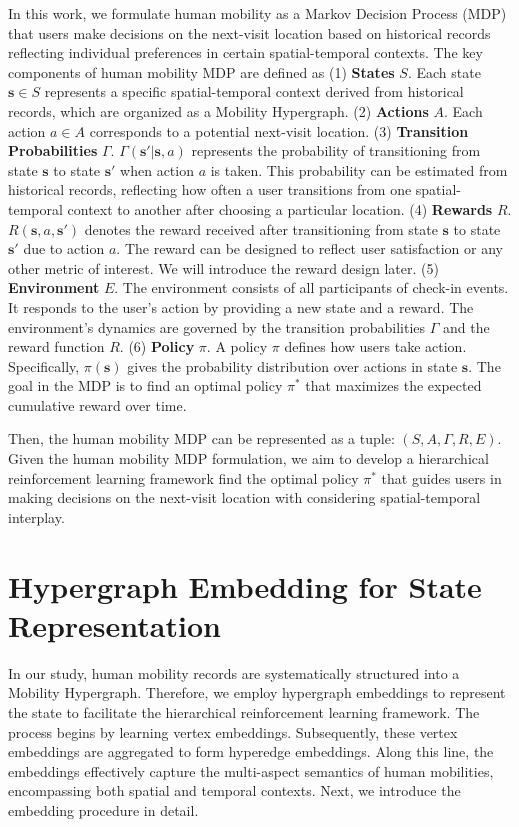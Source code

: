 \documentclass[letterpaper]{article} %
\begin{document}
In this work, we formulate human mobility as a Markov Decision Process (MDP) that users make decisions on the next-visit location based on historical records reflecting individual preferences in certain spatial-temporal contexts. The key components of human mobility MDP are defined as
(1) \textbf{States} $S$. Each state $\mathbf{s} \in S$ represents a specific spatial-temporal context derived from historical records, which are organized as a Mobility Hypergraph.
(2) \textbf{Actions} $A$. Each action $a \in A$ corresponds to a potential next-visit location.
(3) \textbf{Transition Probabilities} $\Gamma$. $\Gamma(\mathbf{s}'|\mathbf{s}, a)$ represents the probability of transitioning from state $\mathbf{s}$ to state $\mathbf{s}'$ when action $a$ is taken. This probability can be estimated from historical records, reflecting how often a user transitions from one spatial-temporal context to another after choosing a particular location.
(4) \textbf{Rewards} $R$. $R(\mathbf{s}, a, \mathbf{s}')$ denotes the reward received after transitioning from state $\mathbf{s}$ to state $\mathbf{s}'$ due to action $a$. The reward can be designed to reflect user satisfaction or any other metric of interest. We will introduce the reward design later.
(5) \textbf{Environment} $E$. The environment consists of all participants of check-in events. It responds to the user's action by providing a new state and a reward. The environment's dynamics are governed by the transition probabilities $\Gamma$ and the reward function $R$.
(6) \textbf{Policy} $\pi$. A policy $\pi$ defines how users take action. Specifically, $\pi(\mathbf{s})$ gives the probability distribution over actions in state $\mathbf{s}$. The goal in the MDP is to find an optimal policy $\pi^*$ that maximizes the expected cumulative reward over time.

Then, the human mobility MDP can be represented as a tuple:
$(S, A, \Gamma, R, E) $.
Given the human mobility MDP formulation, we aim to develop a hierarchical reinforcement learning framework find the optimal policy $\pi^*$ that guides users in making decisions on the next-visit location with considering spatial-temporal interplay.


\section{Hypergraph Embedding for State Representation}
In our study, human mobility records are systematically structured into a Mobility Hypergraph.
Therefore, we employ hypergraph embeddings to represent the state to facilitate the hierarchical reinforcement learning framework.
The process begins by learning vertex embeddings.
Subsequently, these vertex embeddings are aggregated to form hyperedge embeddings.
Along this line, the embeddings effectively capture the multi-aspect semantics of human mobilities, encompassing both spatial and temporal contexts.
Next, we introduce the embedding procedure in detail.
\end{document}
